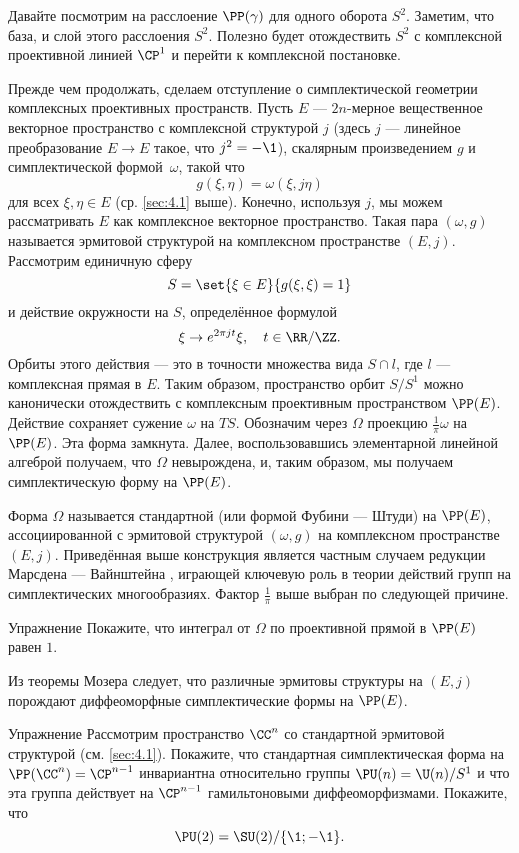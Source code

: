 Давайте посмотрим на расслоение $\PP(\gamma)$ для одного оборота $S^2$.
Заметим, что база, и слой этого расслоения $S^2$.
Полезно будет отождествить $S^2$ с комплексной проективной линией $\CP^1$ и перейти к комплексной постановке.

Прежде чем продолжать, сделаем отступление о симплектической геометрии комплексных проективных пространств.
Пусть $E$ --- $2n$-мерное вещественное векторное пространство с комплексной структурой $j$
(здесь $j$ --- линейное преобразование $E\to E$ такое, что $j^2 = -\1$),
скалярным произведением $g$ и симплектической формой~$\omega$, такой что
\[g(\xi, \eta ) = \omega(\xi, j\eta)\]
для всех $\xi, \eta \in E$ (ср. \ref{sec:4.1} выше).
Конечно, используя $j$, мы можем рассматривать $E$ как комплексное векторное пространство.
Такая пара $(\omega, g)$ называется эрмитовой структурой на комплексном пространстве $(E, j)$.
Рассмотрим единичную сферу
\[S = \set{\xi \in E}{g(\xi, \xi) = 1}\]
и действие окружности на $S$, определённое формулой 
\[\xi \to e^{2\pi jt} \xi,\quad t \in \RR/\ZZ.\]
Орбиты этого действия --- это в точности множества вида $S \cap l$, где $l$ --- комплексная прямая в $E$.
Таким образом, пространство орбит $S/S^1$ можно канонически отождествить с комплексным проективным пространством $\PP(E)$.
Действие сохраняет сужение $\omega$ на $T S$.
Обозначим через $\Omega$ проекцию $\tfrac1\pi \omega$ на $\PP(E)$.
Эта форма замкнута.
Далее, воспользовавшись элементарной линейной алгеброй получаем, что $\Omega$ невырождена, и, таким образом, мы получаем симплектическую форму на $\PP(E)$.

Форма $\Omega$ называется стандартной (или формой Фубини --- Штуди) на $\PP(E)$, ассоциированной с эрмитовой структурой $(\omega, g)$ на комплексном пространстве $(E, j)$.
Приведённая выше конструкция является частным случаем редукции Марсдена --- Вайнштейна \cite{MS}, играющей ключевую роль в теории действий групп на симплектических многообразиях.
Фактор $\tfrac1\pi$ выше выбран по следующей причине.

\begin{thm}{Упражнение}\label{9.2.A}
Покажите, что интеграл от $\Omega$ по проективной прямой в $\PP(E)$ равен $1$.
\end{thm}

Из теоремы Мозера \cite{MS} следует, что различные эрмитовы структуры на $(E, j)$ порождают диффеоморфные симплектические формы на $\PP(E)$.

\begin{thm}{Упражнение}\label{9.2.B}
Рассмотрим пространство $\CC^n$ со стандартной эрмитовой структурой (см. \ref{sec:4.1}).
Покажите, что стандартная симплектическая форма на $\PP(\CC^n ) = \CP^{n-1}$ инвариантна относительно группы $\PU (n) = \U (n)/S^1$ и что эта группа действует на $\CP^{n-1}$ гамильтоновыми диффеоморфизмами.
Покажите, что 
\[\PU (2) = \SU (2)/\{\1; -\1\}.\]

\end{thm}

